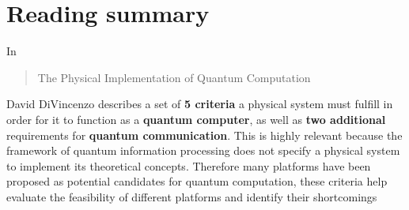 \documentclass{alex_summary}
\begin{document}
\section*{Reading summary}

In \blockcquote{divincenzo_physical_2000}{The Physical Implementation of Quantum Computation} David DiVincenzo describes a set of \textbf{5 criteria} a physical system must fulfill in order for it to function as a \textbf{quantum computer}, as well as \textbf{two additional} requirements for \textbf{quantum communication}. This is highly relevant because the framework of quantum information processing does not specify a physical system to implement its theoretical concepts. Therefore many platforms have been proposed as potential candidates for quantum computation, these criteria help evaluate the feasibility of different platforms and identify their shortcomings
\end{document}

